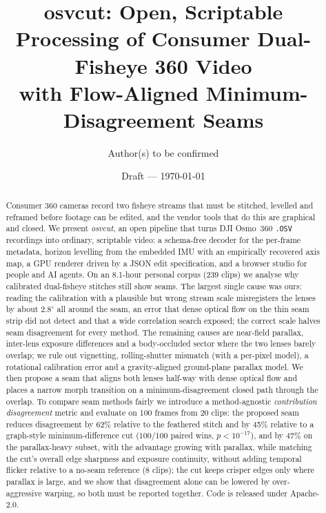 \documentclass[11pt]{article}
\title{osvcut: Open, Scriptable Processing of Consumer Dual-Fisheye 360\textdegree{} Video\\with Flow-Aligned Minimum-Disagreement Seams}
\author{Author(s) to be confirmed}
\date{Draft --- \today}
\begin{document}
\maketitle

\begin{abstract}
Consumer 360\textdegree{} cameras record two fisheye streams that must be stitched, levelled and reframed before footage can be edited, and the vendor tools that do this are graphical and closed.
We present \emph{osvcut}, an open pipeline that turns DJI Osmo~360 \texttt{.OSV} recordings into ordinary, scriptable video: a schema-free decoder for the per-frame metadata, horizon levelling from the embedded IMU with an empirically recovered axis map, a GPU renderer driven by a JSON edit specification, and a browser studio for people and AI agents.
On an 8.1-hour personal corpus (239 clips) we analyse why calibrated dual-fisheye stitches still show seams. The largest single cause was ours: reading the calibration with a plausible but wrong stream scale misregisters the lenses by about $2.8^\circ$ all around the seam, an error that dense optical flow on the thin seam strip did not detect and that a wide correlation search exposed; the correct scale halves seam disagreement for every method. The remaining causes are near-field parallax, inter-lens exposure differences and a body-occluded sector where the two lenses barely overlap; we rule out vignetting, rolling-shutter mismatch (with a per-pixel model), a rotational calibration error and a gravity-aligned ground-plane parallax model.
We then propose a seam that aligns both lenses half-way with dense optical flow and places a narrow morph transition on a minimum-disagreement closed path through the overlap.
To compare seam methods fairly we introduce a method-agnostic \emph{contribution disagreement} metric and evaluate on 100 frames from 20 clips: the proposed seam reduces disagreement by 62\% relative to the feathered stitch and by 45\% relative to a graph-style minimum-difference cut (100/100 paired wins, $p<10^{-17}$), and by 47\% on the parallax-heavy subset, with the advantage growing with parallax, while matching the cut's overall edge sharpness and exposure continuity, without adding temporal flicker relative to a no-seam reference (8 clips); the cut keeps crisper edges only where parallax is large, and we show that disagreement alone can be lowered by over-aggressive warping, so both must be reported together.
Code is released under Apache-2.0.
\end{abstract}
\end{document}
